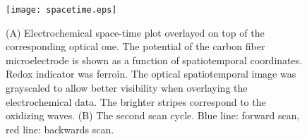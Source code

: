 \documentclass[3p, twocolumn]{elsarticle}
\begin{document}
\def\s{0.5}
\begin{figure}
\centering
{}
\texttt{[image: spacetime.eps]}
\caption{(A) Electrochemical space-time plot overlayed on top of the corresponding optical one.
The potential of the carbon fiber microelectrode is shown as a function of spatiotemporal coordinates.
Redox indicator was ferroin.
The optical spatiotemporal image was grayscaled to allow better visibility when overlaying the electrochemical data.
The brighter stripes correspond to the oxidizing waves.
(B) The second scan cycle.
Blue line: forward scan, red line: backwards scan.
}
\label{fig:spatiotemporal}
\end{figure}
\end{document}
